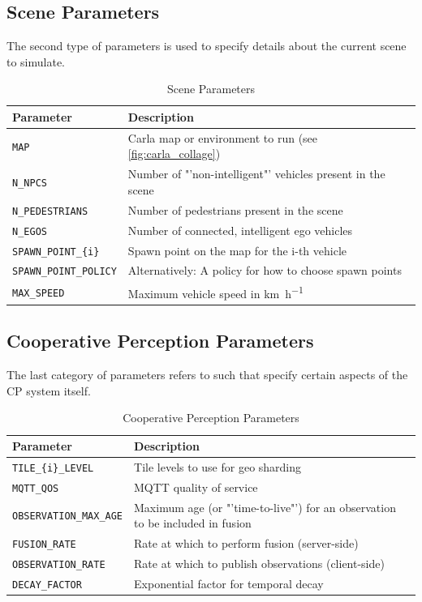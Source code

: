 \subsection{Scene Parameters}
\label{subsec:implementation:scene_parameters}
The second type of parameters is used to specify details about the current scene to simulate.

\begin{table}[H]
	\centering
	\begin{tabular}{|p{7.6cm}|p{7.6cm}|}
		\hline
		\textbf{Parameter} & \textbf{Description} \\ \hline
		\texttt{MAP} & Carla map or environment to run (see \cref{fig:carla_collage}) \\ \hline
		\texttt{N\_NPCS} & Number of "'non-intelligent"' vehicles present in the scene \\ \hline
		\texttt{N\_PEDESTRIANS} & Number of pedestrians present in the scene \\ \hline
		\texttt{N\_EGOS} & Number of connected, intelligent ego vehicles \\ \hline
		\texttt{SPAWN\_POINT\_\{i\}} & Spawn point on the map for the i-th vehicle \\ \hline
		\texttt{SPAWN\_POINT\_POLICY} & Alternatively: A policy for how to choose spawn points \\ \hline
		\texttt{MAX\_SPEED} & Maximum vehicle speed in \si{\km\per\hour} \\ \hline
	\end{tabular}
	\caption{Scene Parameters}
	\label{tab:scene_parameters}
\end{table}

\subsection{Cooperative Perception Parameters}
\label{subsec:implementation:cooperative_perception_parameters}
The last category of parameters refers to such that specify certain aspects of the CP system itself.

\begin{table}[H]
	\centering
	\begin{tabular}{|p{7.6cm}|p{7.6cm}|}
		\hline
		\textbf{Parameter} & \textbf{Description} \\ \hline
		\texttt{TILE\_\{i\}\_LEVEL} & Tile levels to use for geo sharding \\ \hline
		\texttt{MQTT\_QOS} & MQTT quality of service \\ \hline
		\texttt{OBSERVATION\_MAX\_AGE} & Maximum age (or "'time-to-live"') for an observation to be included in fusion \\ \hline
		\texttt{FUSION\_RATE} & Rate at which to perform fusion (server-side) \\ \hline
		\texttt{OBSERVATION\_RATE} & Rate at which to publish observations (client-side) \\ \hline
		\texttt{DECAY\_FACTOR} & Exponential factor for temporal decay \\ \hline
	\end{tabular}
	\caption{Cooperative Perception Parameters}
	\label{tab:cooperative_perception_parameters}
\end{table}

